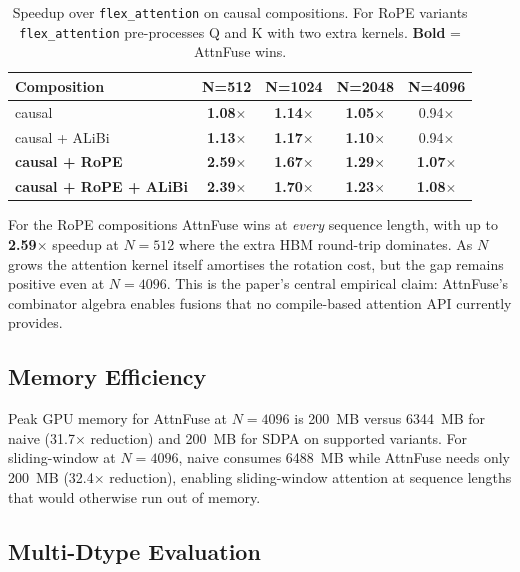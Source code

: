 \documentclass[10pt,twocolumn]{article}
\begin{document}
\begin{table}[H]
\centering
\caption{Speedup over \texttt{flex\_attention} on causal compositions.
For RoPE variants \texttt{flex\_attention} pre-processes Q and K with
two extra kernels. \textbf{Bold} = AttnFuse wins.}
\label{tab:composition}
\small
\begin{tabular}{lcccc}
\toprule
\textbf{Composition} & \textbf{N=512} & \textbf{N=1024} & \textbf{N=2048} & \textbf{N=4096} \\
\midrule
causal               & \textbf{1.08}$\times$ & \textbf{1.14}$\times$ & \textbf{1.05}$\times$ & 0.94$\times$ \\
causal + ALiBi       & \textbf{1.13}$\times$ & \textbf{1.17}$\times$ & \textbf{1.10}$\times$ & 0.94$\times$ \\
\textbf{causal + RoPE}            & \textbf{2.59}$\times$ & \textbf{1.67}$\times$ & \textbf{1.29}$\times$ & \textbf{1.07}$\times$ \\
\textbf{causal + RoPE + ALiBi}    & \textbf{2.39}$\times$ & \textbf{1.70}$\times$ & \textbf{1.23}$\times$ & \textbf{1.08}$\times$ \\
\bottomrule
\end{tabular}
\end{table}

For the RoPE compositions AttnFuse wins at \emph{every} sequence length,
with up to \textbf{2.59$\times$} speedup at $N{=}512$ where the extra
HBM round-trip dominates. As $N$ grows the attention kernel itself
amortises the rotation cost, but the gap remains positive even at
$N{=}4096$. This is the paper's central empirical claim: AttnFuse's
combinator algebra enables fusions that no compile-based attention API
currently provides.

\subsection{Memory Efficiency}

Peak GPU memory for AttnFuse at $N{=}4096$ is 200~MB versus 6344~MB for
naive (31.7$\times$ reduction) and 200~MB for SDPA on supported variants.
For sliding-window at $N{=}4096$, naive consumes 6488~MB while AttnFuse
needs only 200~MB (32.4$\times$ reduction), enabling sliding-window
attention at sequence lengths that would otherwise run out of memory.

\subsection{Multi-Dtype Evaluation}
\end{document}
